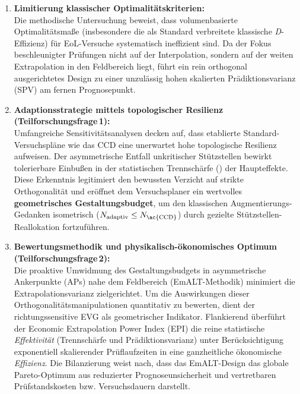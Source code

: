 \begin{enumerate}
      \item \textbf{Limitierung klassischer Optimalitätskriterien:} \\
            Die methodische Untersuchung beweist, dass volumenbasierte Optimalitätsmaße (insbesondere die als Standard verbreitete klassische \textit{D}-Effizienz) für \ac{EoL}-Versuche systematisch ineffizient sind.
            Da der Fokus beschleunigter Prüfungen nicht auf der Interpolation, sondern auf der weiten Extrapolation in den Feldbereich liegt, führt ein rein orthogonal ausgerichtetes Design zu einer unzulässig hohen skalierten Prädiktionsvarianz (\ac{SPV}) am fernen Prognosepunkt.

      \item \textbf{Adaptionsstrategie mittels topologischer Resilienz (Teilforschungsfrage\,1):} \\
            Umfangreiche Sensitivitätsanalysen decken auf, dass etablierte Stand\-ard-Ver\-suchs\-plä\-ne wie das \ac{CCD} eine unerwartet hohe topologische Resilienz aufweisen.
            Der asymmetrische Entfall unkritischer Stützstellen bewirkt tolerierbare Einbußen in der statistischen Trennschärfe () der Haupteffekte.
            Diese Erkenntnis legitimiert den bewussten Verzicht auf strikte Orthogonalität und eröffnet dem Versuchsplaner ein wertvolles \textbf{geometrisches Gestaltungsbudget}, um den klassischen Augmentierungs-Gedanken isometrisch ($N_{\text{adaptiv}} \le N_{\text{\ac{CCD}}}$) durch gezielte Stützstellen-Reallokation fortzuführen.

      \item \textbf{Bewertungsmethodik und physikalisch-ökonomisches Optimum (Teilforschungsfrage\,2):} \\
            Die proaktive Umwidmung des Gestaltungsbudgets in asymmetrische Ankerpunkte (\acp{AP}) nahe dem Feldbereich (\ac{EmALT}-Methodik) minimiert die Extrapolationsvarianz zielgerichtet.
            Um die Auswirkungen dieser Orthogonalitätsmanipulationen quantitativ zu bewerten, dient der richtungssensitive \ac{EVG} als geometrischer Indikator.
            Flankierend überführt der Economic Extrapolation Power Index (\ac{EPI}) die reine statistische \textit{Effektivität} (Trennschärfe und Prädiktionsvarianz) unter Berücksichtigung exponentiell skalierender Prüflaufzeiten in eine ganzheitliche ökonomische \textit{Effizienz}.
            Die Bilanzierung weist nach, dass das \ac{EmALT}-Design das globale Pareto-Optimum aus reduzierter Prognoseunsicherheit und vertretbaren Prüfstandskosten bzw. Versuchsdauern darstellt.


\end{enumerate}
